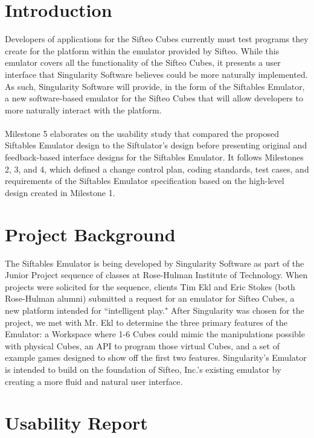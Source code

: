 \documentclass[12pt]{article}
\begin{document}
\section{Introduction}
Developers of applications for the \gls{Sifteo Cubes} currently must test programs they create for the platform within the emulator provided by Sifteo. While this emulator covers all  the functionality of the Sifteo Cubes, it presents a user interface that Singularity Software believes could be more naturally implemented. As such, Singularity Software will provide, in the form of the Siftables Emulator, a new software-based emulator for the Sifteo Cubes that will allow developers to more naturally interact with the platform.\\\\
Milestone 5 elaborates on the \gls{usability study} that compared the proposed Siftables Emulator design to the Siftulator's design before presenting original and feedback-based interface designs for the Siftables Emulator. It follows Milestones 2, 3, and 4, which defined a change control plan, coding standards, test cases, and requirements of the Siftables Emulator specification based on the high-level design created in Milestone 1. 

\section{Project Background}
The Siftables Emulator is being developed by Singularity Software as part of the Junior Project sequence of classes at Rose-Hulman Institute of Technology. When projects were solicited for the sequence, clients Tim Ekl and Eric Stokes (both Rose-Hulman alumni) submitted a request for an emulator for Sifteo Cubes, a new platform intended for ``intelligent play." After Singularity was chosen for the project, we met with Mr. Ekl to determine the three primary features of the Emulator: a Workspace where 1-6 Cubes could mimic the manipulations possible with physical Cubes, an \gls{API} to program those virtual Cubes, and a set of example games designed to show off the first two features. Singularity's Emulator is intended to build on the foundation of Sifteo, Inc.'s existing emulator by creating a more fluid and natural user interface.

\section{Usability Report}
\end{document}
